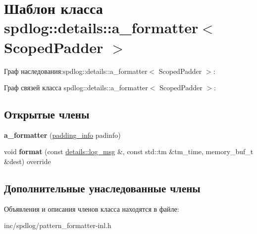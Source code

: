 \hypertarget{classspdlog_1_1details_1_1a__formatter}{}\section{Шаблон класса spdlog\+:\+:details\+:\+:a\+\_\+formatter$<$ Scoped\+Padder $>$}
\label{classspdlog_1_1details_1_1a__formatter}


Граф наследования\+:spdlog\+:\+:details\+:\+:a\+\_\+formatter$<$ Scoped\+Padder $>$\+:


Граф связей класса spdlog\+:\+:details\+:\+:a\+\_\+formatter$<$ Scoped\+Padder $>$\+:
\subsection*{Открытые члены}
\begin{DoxyCompactItemize}
\item 
\mbox{\label{classspdlog_1_1details_1_1a__formatter_a57a2680c1bb85976f848f3bc970f18a7}} 
{\bfseries a\+\_\+formatter} (\hyperlink{structspdlog_1_1details_1_1padding__info}{padding\+\_\+info} padinfo)
\item 
\mbox{\label{classspdlog_1_1details_1_1a__formatter_aed130b61af8c4b9b55bcd2dbaacd43da}} 
void {\bfseries format} (const \hyperlink{structspdlog_1_1details_1_1log__msg}{details\+::log\+\_\+msg} \&, const std\+::tm \&tm\+\_\+time, memory\+\_\+buf\+\_\+t \&dest) override
\end{DoxyCompactItemize}
\subsection*{Дополнительные унаследованные члены}


Объявления и описания членов класса находятся в файле\+:\begin{DoxyCompactItemize}
\item 
inc/spdlog/pattern\+\_\+formatter-\/inl.\+h\end{DoxyCompactItemize}

